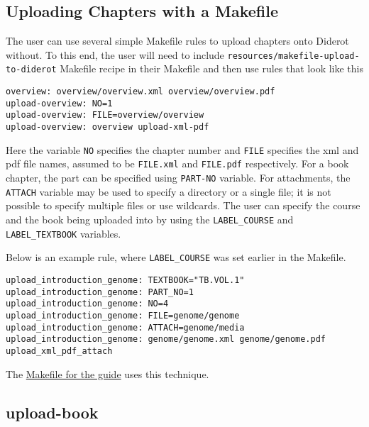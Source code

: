 \subsection{Uploading Chapters with a Makefile}

\begin{gram}
The user can use several simple Makefile rules to upload chapters onto
Diderot without.  To this end, the user will need to include
\verb|resources/makefile-upload-to-diderot| Makefile recipe in their
Makefile and then use rules that look like this
\begin{verbatim}
overview: overview/overview.xml overview/overview.pdf
upload-overview: NO=1
upload-overview: FILE=overview/overview
upload-overview: overview upload-xml-pdf
\end{verbatim}

Here the variable \verb|NO| specifies the chapter number and \verb|FILE| specifies the xml and pdf file names, assumed to be \verb|FILE.xml| and \verb|FILE.pdf| respectively.  
%
For a book chapter, the part can be specified using \verb|PART-NO| variable.
%
For attachments, the \verb|ATTACH| variable may be used to specify a directory or a single file; it is not possible to specify multiple files or use wildcards.
%
The user can specify the course and the book being uploaded into by using the
\verb|LABEL_COURSE| and \verb|LABEL_TEXTBOOK| variables. 

Below is an example rule, where \verb|LABEL_COURSE| was set earlier in the Makefile.


\begin{verbatim}
upload_introduction_genome: TEXTBOOK="TB.VOL.1"
upload_introduction_genome: PART_NO=1 
upload_introduction_genome: NO=4
upload_introduction_genome: FILE=genome/genome
upload_introduction_genome: ATTACH=genome/media
upload_introduction_genome: genome/genome.xml genome/genome.pdf upload_xml_pdf_attach
\end{verbatim}
\end{gram}

\begin{gram}
The \href{file://cli/attachments/Makefile-guide}{Makefile for the guide} uses this technique.

\end{gram}

\subsection{upload-book}

